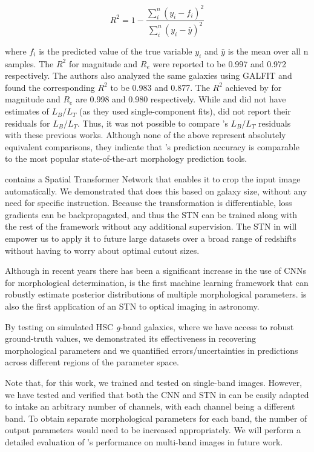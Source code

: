 \begin{equation}
R^{2}=1-\frac{\sum_{i}^{n}\left(y_{i}-f_{i}\right)^{2}}{\sum_{i}^{n}\left(y_{i}-\bar{y}\right)^{2}}
\end{equation}

where $f_i$ is the predicted value of the true variable $y_i$ and $\bar{y}$ is the mean over all n samples. The $R^2$ for magnitude and $R_e$ were reported to be 0.997 and 0.972 respectively. The authors also analyzed the same galaxies using GALFIT and found the corresponding $R^2$ to be 0.983 and 0.877. The $R^2$ achieved by \gampen{} for magnitude and $R_e$ are 0.998 and 0.980 respectively. While \citet{haussler_07} and \citet{Tuccillo2018DeepFitting} did not have estimates of $L_B/L_T$ (as they used single-component fits), \citet{meert_13} did not report their residuals for $L_B/L_T$. Thus, it was not possible to compare \gampen{}'s $L_B/L_T$ residuals with these previous works. Although none of the above represent absolutely equivalent comparisons, they indicate that \gampen{}'s prediction accuracy is comparable to the most popular state-of-the-art morphology prediction tools.

\gampen{} contains a Spatial Transformer Network that enables it to crop the input image automatically. We demonstrated that \gampen{} does this based on galaxy size, without any need for specific instruction. %
Because the transformation is differentiable, loss gradients can be backpropagated, and thus the STN can be trained along with the rest of the framework without any additional supervision. The STN in \gampen{} will empower us to apply it to future large datasets over a broad range of redshifts without having to worry about optimal cutout sizes.  

Although in recent years there has been a significant increase in the use of CNNs for morphological determination, \gampen{} is the first machine learning framework that can robustly estimate posterior distributions of multiple morphological parameters. \gampen{} is also the first application of an STN to optical imaging in astronomy. 

By testing \gampen{} on simulated HSC \textit{g}-band galaxies, where we have access to robust ground-truth values, we demonstrated its effectiveness in recovering morphological parameters and we quantified errors/uncertainties in \gampen{} predictions across different regions of the parameter space. 

Note that, for this work, we trained and tested \gampen{} on single-band images. However, we have tested and verified that both the CNN and STN in \gampen{} can be easily adapted to intake an arbitrary number of channels, with each channel being a different band. To obtain separate morphological parameters for each band, the number of output parameters would need to be increased appropriately. We will perform a detailed evaluation of \gampen{}'s performance on multi-band images in future work.

